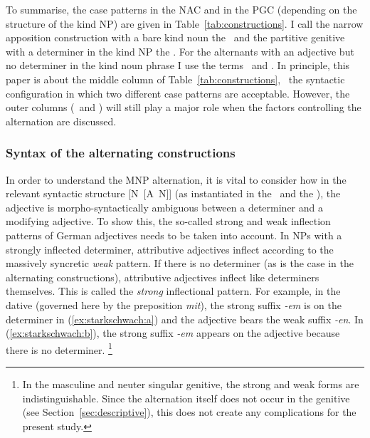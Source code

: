 To summarise, the case patterns in the NAC and in the PGC (depending on the structure of the kind NP) are given in Table~\ref{tab:constructions}.
I call the narrow apposition construction with a bare kind noun the \NACb\ and the partitive genitive with a determiner in the kind NP the \PGCd.
For the alternants with an adjective but no determiner in the kind noun phrase I use the terms \NACa\ and \PGCa.
In principle, this paper is about the middle column of Table~\ref{tab:constructions}, \ie\ the syntactic configuration in which two different case patterns are acceptable.
However, the outer columns (\NACb\ and \PGCd) will still play a major role when the factors controlling the alternation are discussed.


\subsubsection{Syntax of the alternating constructions}
\label{sec:syntax}

In order to understand the MNP alternation, it is vital to consider how in the relevant syntactic structure [N~[A~N]] (as instantiated in the \NACa\ and the \PGCa), the adjective is morpho-syntactically ambiguous between a determiner and a modifying adjective.
To show this, the so-called strong and weak inflection patterns of German adjectives needs to be taken into account.
In NPs with a strongly inflected determiner, attributive adjectives inflect according to the massively syncretic \textit{weak} pattern.
If there is no determiner (as is the case in the alternating constructions), attributive adjectives inflect like determiners themselves.
This is called the \textit{strong} inflectional pattern.
For example, in the dative (governed here by the preposition \textit{mit}), the strong suffix \textit{-em} is on the determiner in (\ref{ex:starkschwach:a}) and the adjective bears the weak suffix \textit{-en}. 
In (\ref{ex:starkschwach:b}), the strong suffix \textit{-em} appears on the adjective because there is no determiner.%
\footnote{In the masculine and neuter singular genitive, the strong and weak forms are indistinguishable.
Since the alternation itself does not occur in the genitive (see Section~\ref{sec:descriptive}), this does not create any complications for the present study.}

\begin{exe}
  \ex\label{ex:starkschwach} 
  \begin{xlist}
  \end{xlist}
\end{exe}

